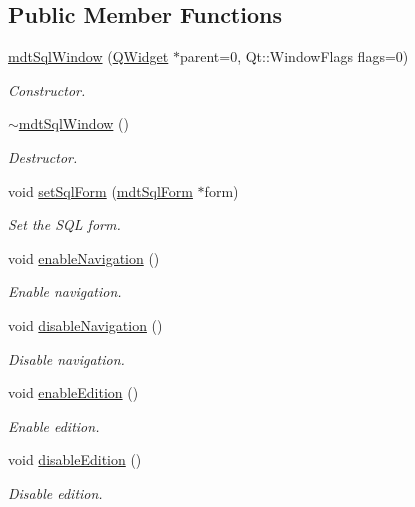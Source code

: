 \subsection*{Public Member Functions}
\begin{DoxyCompactItemize}
\item 
\hyperlink{classmdt_sql_window_a8624cc7a7a454e759c753c2faddd46e6}{mdt\-Sql\-Window} (\hyperlink{class_q_widget}{Q\-Widget} $\ast$parent=0, Qt\-::\-Window\-Flags flags=0)
\begin{DoxyCompactList}\small\item\em Constructor. \end{DoxyCompactList}\item 
\hyperlink{classmdt_sql_window_a050588d255a48722438421b754b808f3}{$\sim$mdt\-Sql\-Window} ()
\begin{DoxyCompactList}\small\item\em Destructor. \end{DoxyCompactList}\item 
void \hyperlink{classmdt_sql_window_ad9a237b7bea72d92a4743f09c28e38ae}{set\-Sql\-Form} (\hyperlink{classmdt_sql_form}{mdt\-Sql\-Form} $\ast$form)
\begin{DoxyCompactList}\small\item\em Set the S\-Q\-L form. \end{DoxyCompactList}\item 
void \hyperlink{classmdt_sql_window_a6d4d853c8c64a99ff2e396b99ea63a87}{enable\-Navigation} ()
\begin{DoxyCompactList}\small\item\em Enable navigation. \end{DoxyCompactList}\item 
void \hyperlink{classmdt_sql_window_a961d587d63b0997a10db6728773a108f}{disable\-Navigation} ()
\begin{DoxyCompactList}\small\item\em Disable navigation. \end{DoxyCompactList}\item 
void \hyperlink{classmdt_sql_window_a42d1283a05eddd2a48af74cf764ef240}{enable\-Edition} ()
\begin{DoxyCompactList}\small\item\em Enable edition. \end{DoxyCompactList}\item 
void \hyperlink{classmdt_sql_window_a629fa57fcdde0e4db0fc93efd84c9123}{disable\-Edition} ()
\begin{DoxyCompactList}\small\item\em Disable edition. \end{DoxyCompactList}\end{DoxyCompactItemize}
